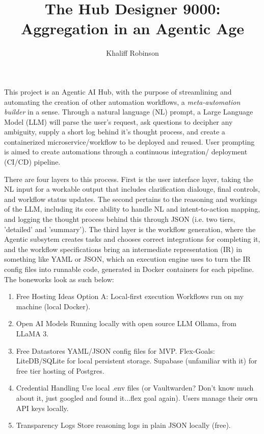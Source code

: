 \documentclass[12pt]{article}
\title{\textbf{The Hub Designer 9000: Aggregation in an Agentic Age}}
\author{Khaliff Robinson}
\begin{document}
\maketitle

This project is an Agentic AI Hub, with the purpose of streamlining and automating the creation of other automation workflows, a \textit{meta-automation builder} in a sense. Through a natural language (NL) prompt, a Large Language Model (LLM) will parse the user's request, ask questions to decipher any ambiguity, supply a short log behind it's thought process, and create a containerized microservice/workflow to be deployed and reused. User prompting is aimed to create automations through a continuous integration/ deployment (CI/CD) pipeline. 

There are four layers to this process. First is the user interface layer, taking the NL input for a workable output that includes clarification dialouge, final controls, and workflow status updates. The second pertains to the reasoning and workings of the LLM, including its core ability to handle NL and intent-to-action mapping, and logging the thought process behind this through JSON (i.e. two tiers, 'detailed' and 'summary').
The third layer is the workflow generation, where the Agentic subsytem creates tasks and chooses correct integrations for completing it, and the workflow specifications bring an intermediate representation (IR) in something like YAML or JSON, which an execution engine uses to turn the IR config files into runnable code, generated in Docker containers for each pipeline.
The boneworks look as such below:
\begin{enumerate}
	\item Free Hosting Ideas
Option A: Local-first execution
Workflows run on my machine (local Docker).

	\item Open AI Models
Running locally with open source LLM Ollama, from LLaMA 3.

	\item Free Datastores
YAML/JSON config files for MVP.
Flex-Goals:
	LiteDB/SQLite for local persistent storage.
	Supabase (unfamiliar with it) for free tier hosting of Postgres.

	\item Credential Handling
Use local .env files (or Vaultwarden? Don't know much about it, just googled and found it...flex goal again).
Users manage their own API keys locally.

	\item Transparency Logs
Store reasoning logs in plain JSON locally (free).
\end{enumerate}
\end{document}
